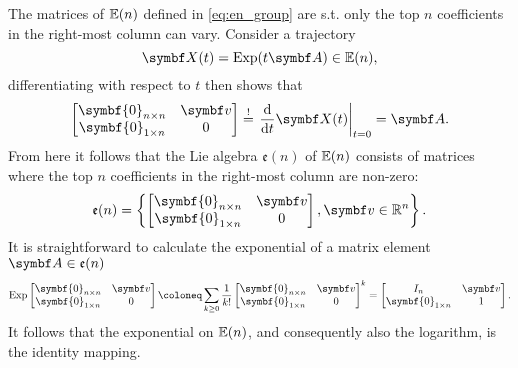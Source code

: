 The matrices of ${\mathbb{E}(n)}$ defined in \eqref{eq:en_group} are s.t. only the top $n$ coefficients in the right-most column can vary. Consider a trajectory
\begin{equation}
  \X(t) = \Exp(t \A) \in \En,
\end{equation}
differentiating with respect to $t$ then shows that
\begin{equation}
  \begin{bmatrix}
    \symbf{0}_{n \times n} & \bv \\ \symbf{0}_{1 \times n} & 0
  \end{bmatrix} \overset{!}{=} \left.\frac{\mathrm{d}}{\mathrm{d}t} \X(t) \right|_{t = 0} = \A.
\end{equation}
From here it follows that the Lie algebra $\mathfrak{e}(n)$ of ${\mathbb{E}(n)}$ consists of matrices where the top $n$ coefficients in the right-most column are non-zero:
\begin{equation}
  \mathfrak{e}(n) = \left\{ \begin{bmatrix} \symbf{0}_{n \times n} & \bv \\ \symbf{0}_{1 \times n} & 0\end{bmatrix}, \bv \in \mathbb{R}^n \right\}.
\end{equation}
It is straightforward to calculate the exponential of a matrix element $\A \in \mathfrak{e}(n)$
\begin{equation}
  \Exp \begin{bmatrix}
    \symbf{0}_{n \times n} & \bv \\ \symbf{0}_{1 \times n} & 0
  \end{bmatrix} \coloneq \sum_{k \geq 0} \frac{1}{k!} \begin{bmatrix}
    \symbf{0}_{n \times n} & \bv \\ \symbf{0}_{1 \times n} & 0
  \end{bmatrix}^k
  = \begin{bmatrix} I_n & \bv \\ \symbf{0}_{1 \times n} & 1 \end{bmatrix}.
\end{equation}
It follows that the exponential on ${\mathbb{E}(n)}$, and consequently also the logarithm, is the identity mapping.

